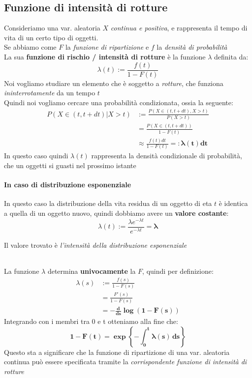 \documentclass[]{article}
\begin{document}
    \subsection{Funzione di intensità di rotture}
    Consideriamo una var. aleatoria $X$ \textit{continua e positiva}, e rappresenta il tempo di vita di un certo tipo di oggetti. \\
    Se abbiamo come $F$ la \textit{funzione di ripartizione} e $f$ la \textit{densità di probabilità} \\
    La sua \textbf{funzione di rischio / intensità di rotture} è la funzione $\lambda$ definita da:
    \[ \lambda(t) := \frac{f(t)}{1 - F(t)} \]
    Noi vogliamo studiare un elemento che è soggetto a \textit{rotture}, che funziona \textit{ininterrotamente} da un tempo $t$ \\
    Quindi noi vogliamo cercare una probabilità condizionata, ossia la seguente:
    \begin{equation*}
        \begin{split}
            P(X \in (t, t+ dt) | X > t) &:= \frac{P(X \in (t,t+dt), X > t)}{P(X>t)} \\
            &= \frac{P(X \in (t,t+dt))}{1 -F(t)} \\
            &\approx \frac{f(t) dt}{1-F(t)} =: \boldsymbol{\lambda(t) dt}
        \end{split}
    \end{equation*}
    In questo caso quindi $\lambda(t)$ rappresenta la densità condizionale di probabilità, che un oggetti si guasti nel prossimo istante
    \paragraph{In caso di distribuzione esponenziale} In questo caso la distribuzione della vita residua di un oggetto di eta $t$ è identica a quella di un oggetto nuovo, quindi dobbiamo avere un \textbf{valore costante}:
    \[ \lambda(t) := \frac{\lambda e^{-\lambda t}}{e^{-\lambda t}} = \boldsymbol{\lambda} \]
    \centerline{Il valore trovato è \textit{l'intensità della distribuzione esponenziale}} \\[2ex]
    La funzione $\lambda$ determina \textbf{univocamente} la $F$, quindi per definizione:
    \begin{equation}
        \begin{split}
            \lambda(s) &:= \frac{f(s)}{1-F(s)} \\
            &= \frac{F'(s)}{1 - F(s)} \\
            &= \boldsymbol{- \frac{d}{ds} \log (1- F(s))}
        \end{split}
    \end{equation}
    Integrando con i membri tra 0 e t otteniamo alla fine che:
    \[ \boldsymbol{1 - F(t) = \exp \left\{ - \int_{0}^{t} \lambda(s) \, ds \right\}} \]
    Questo sta a significare che la funzione di ripartizione di una var. aleatoria continua può essere specificata tramite la \textit{corrispondente funzione di intensità di rotture}
\end{document}
